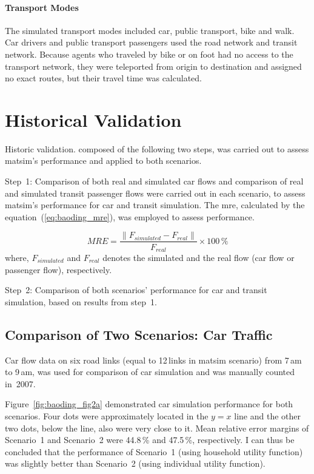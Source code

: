 \paragraph{Transport Modes} The simulated transport modes included car, public transport, bike and walk. Car drivers and public transport passengers used the road network and transit network. Because agents who traveled by bike or on foot had no access to the transport network, they were teleported from origin to destination and assigned no exact routes, but their travel time was calculated. 

\section{Historical Validation}
Historic validation. composed of the following two steps, was carried out to assess \gls{matsim}'s performance and applied to both scenarios. 

Step~1: Comparison of both real and simulated car flows and comparison of real and simulated transit passenger flows were carried out in each scenario, to assess  \gls{matsim}'s performance for car and transit simulation. 
The \gls{mre},  calculated by the equation~(\ref{eq:baoding_mre}), was employed to assess performance.

\begin{equation}
\label{eq:baoding_mre}
MRE = \frac{\lVert F_{simulated} - F_{real} \lVert}{F_{real}} \times 100\,\%
\end{equation} 
where, $F_{simulated}$ and $F_{real}$ denotes the simulated and the real flow (car flow or passenger flow), respectively.

Step~2: Comparison of both scenarios' performance for car and transit simulation, based on results from step~1. 

\subsection{Comparison of Two Scenarios: Car Traffic}
Car flow data on six road links (equal to 12\,links in \gls{matsim} scenario) from 7\,am to 9\,am, was used for comparison of car simulation and was manually counted in~2007. 

Figure~\ref{fig:baoding_fig2a} demonstrated car simulation performance for both scenarios. 
Four dots were approximately located in the $y=x$ line and the other two dots, below the line, also were very close to it. 
Mean relative error margins of Scenario~1 and Scenario~2 were 44.8\,\% and 47.5\,\%, respectively. 
I can thus be concluded that the performance of Scenario~1 (using  household utility function) was slightly better than Scenario~2 (using individual utility function). 

